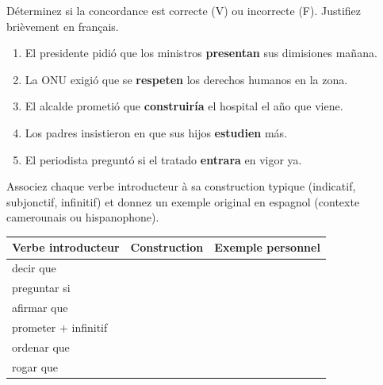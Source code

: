 \documentclass[11pt]{article}
\begin{document}
\begin{exercice}
Déterminez si la concordance est correcte (V) ou incorrecte (F). Justifiez brièvement en français.
\begin{enumerate}
\item El presidente pidió que los ministros \textbf{presentan} sus dimisiones mañana.
\item La ONU exigió que se \textbf{respeten} los derechos humanos en la zona.
\item El alcalde prometió que \textbf{construiría} el hospital el año que viene.
\item Los padres insistieron en que sus hijos \textbf{estudien} más.
\item El periodista preguntó si el tratado \textbf{entrara} en vigor ya.
\end{enumerate}
\end{exercice}

\begin{exercice}
Associez chaque verbe introducteur à sa construction typique (indicatif, subjonctif, infinitif) et donnez un exemple original en espagnol (contexte camerounais ou hispanophone).
\begin{center}
\begin{tabularx}{\linewidth}{|X|X|X|}
\hline
\rowcolor{popblueL}
Verbe introducteur & Construction & Exemple personnel \\
\hline
decir que & & \\
\hline
preguntar si & & \\
\hline
afirmar que & & \\
\hline
prometer + infinitif & & \\
\hline
ordenar que & & \\
\hline
rogar que & & \\
\hline
\end{tabularx}
\end{center}
\end{exercice}
\end{document}
